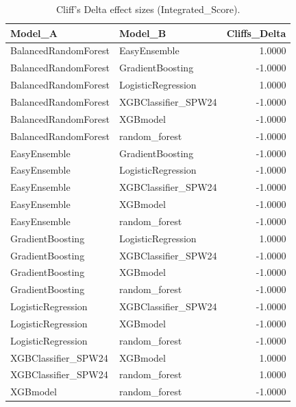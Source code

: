 \begin{table}[t]
\centering
\begin{tabular}{llr}
\toprule
Model_A & Model_B & Cliffs_Delta \\
\midrule
BalancedRandomForest & EasyEnsemble & 1.0000 \\
BalancedRandomForest & GradientBoosting & -1.0000 \\
BalancedRandomForest & LogisticRegression & 1.0000 \\
BalancedRandomForest & XGBClassifier_SPW24 & -1.0000 \\
BalancedRandomForest & XGBmodel & -1.0000 \\
BalancedRandomForest & random_forest & -1.0000 \\
EasyEnsemble & GradientBoosting & -1.0000 \\
EasyEnsemble & LogisticRegression & -1.0000 \\
EasyEnsemble & XGBClassifier_SPW24 & -1.0000 \\
EasyEnsemble & XGBmodel & -1.0000 \\
EasyEnsemble & random_forest & -1.0000 \\
GradientBoosting & LogisticRegression & 1.0000 \\
GradientBoosting & XGBClassifier_SPW24 & -1.0000 \\
GradientBoosting & XGBmodel & -1.0000 \\
GradientBoosting & random_forest & -1.0000 \\
LogisticRegression & XGBClassifier_SPW24 & -1.0000 \\
LogisticRegression & XGBmodel & -1.0000 \\
LogisticRegression & random_forest & -1.0000 \\
XGBClassifier_SPW24 & XGBmodel & 1.0000 \\
XGBClassifier_SPW24 & random_forest & 1.0000 \\
XGBmodel & random_forest & -1.0000 \\
\bottomrule
\end{tabular}
\caption{Cliff's Delta effect sizes (Integrated_Score).}
\label{tab:cliffs_Integrated_Score}
\end{table}